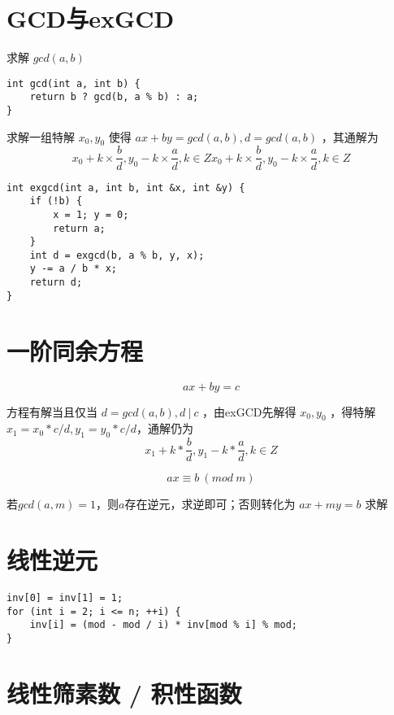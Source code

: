 \section{GCD与exGCD}
\par \noindent 求解 $gcd(a,b)$
\begin{verbatim}
int gcd(int a, int b) {
    return b ? gcd(b, a % b) : a;
}
\end{verbatim}

\par \noindent 求解一组特解 $x_0,y_0$ 使得 $ax+by = gcd(a,b),d=gcd(a,b)$ ，其通解为
$$
x_0+k×\frac{b}{d},y_0-k×\frac{a}{d}, k \in Zx_0+k×\frac{b}{d},y_0-k×\frac{a}{d}, k \in Z
$$

\begin{verbatim}
int exgcd(int a, int b, int &x, int &y) {
    if (!b) {
        x = 1; y = 0;
        return a;
    }
    int d = exgcd(b, a % b, y, x);
    y -= a / b * x;
    return d;
}
\end{verbatim}

\section{一阶同余方程}

$$
ax+by = c
$$

\par \noindent 方程有解当且仅当 $d = gcd(a,b),d\ |\ c$ ，由exGCD先解得 $x_0,y_0$ ，得特解 $x_1 = x_0*c/d,y_1=y_0*c/d$，通解仍为
$$
x_1 + k*\frac{b}{d},y_1-k*\frac{a}{d},k\in Z
$$

$$
ax \equiv b\ (mod\ m)​
$$

若$gcd(a,m) = 1$，则$a$存在逆元，求逆即可；否则转化为 $ax + my = b$ 求解
\section{线性逆元}
\begin{verbatim}
inv[0] = inv[1] = 1;
for (int i = 2; i <= n; ++i) {
    inv[i] = (mod - mod / i) * inv[mod % i] % mod;
}
\end{verbatim}

\section{线性筛素数 / 积性函数}

